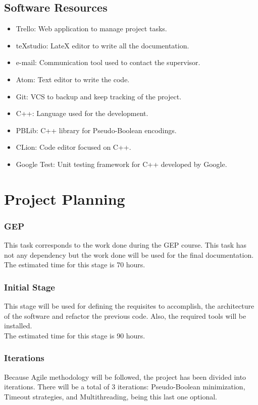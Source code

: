 \subsection{Software Resources}
\begin{itemize}
	\item Trello: Web application to manage project tasks.
	\item teXstudio: LateX editor to write all the documentation.
	\item e-mail: Communication tool used to contact the supervisor. 
	\item Atom: Text editor to write the code.
	\item Git: VCS to backup and keep tracking of the project.
	\item C++: Language used for the development.
	\item PBLib: C++ library for Pseudo-Boolean encodings.
	\item CLion: Code editor focused on C++.
	\item Google Test: Unit testing framework for C++ developed by Google.
\end{itemize}

\section{Project Planning}

\subsubsection{GEP}
This task corresponds to the work done during the GEP course. This task has not any dependency but the work done will be used for the final documentation.\\

The estimated time for this stage is 70 hours.
\subsubsection{Initial Stage}
This stage will be used for defining the requisites to accomplish, the architecture of the software and refactor the previous code. Also, the required tools will be installed. \\

The estimated time for this stage is 90 hours.
\subsubsection{Iterations}
Because Agile methodology will be followed, the project has been divided into iterations. There will be a total of 3 iterations: Pseudo-Boolean minimization, Timeout strategies, and Multithreading, being this last one optional. \\

